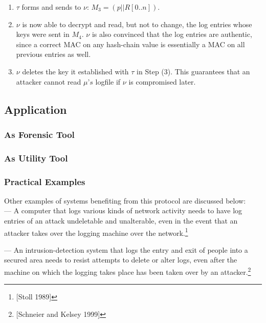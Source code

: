 \documentclass[12pt, letter]{article}
\begin{document}
\begin{enumerate}
    \item $\tau$ forms and sends to $\nu$: $M_3 = (p|| R[0..n])$.
    
    \item $\nu$ is now able to decrypt and read, but not to change, the log entries whose keys were sent in $M_4$. $\nu$ is also convinced that the log entries are authentic, since a correct MAC on any hash-chain value is essentially a MAC on all previous entries as well.
    
    \item $\nu$ deletes the key it established with $\tau$ in Step (3). This guarantees that an attacker cannot read $\mu’s$ logfile if $\nu$ is compromised later. 

\end{enumerate}



\subsection{Application}
\label{sec:application}

\blindtext

\subsubsection{As Forensic Tool}

\blindtext

\subsubsection{As Utility Tool}

\blindtext

\subsubsection{Practical Examples}

Other examples of systems benefiting from this protocol are discussed below:\\

— A computer that logs various kinds of network activity needs to have log entries of an attack undeletable and unalterable, even in the event that an attacker takes over the logging machine over the network.\footnote{[Stoll 1989]}

— An intrusion-detection system that logs the entry and exit of people into a secured area needs to resist attempts to delete or alter logs, even after the machine on which the logging takes place has been taken over by an attacker.\footnote{[Schneier and Kelsey 1999]}
\end{document}
